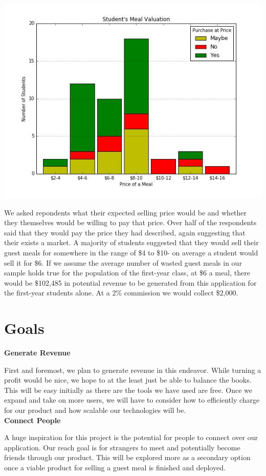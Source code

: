 \documentclass[column,12pt]{article}
\begin{document}
\centerline{\includegraphics[scale=0.5]{meal_valuation.png}}
We asked repondents what their expected selling price would be and whether they themselves would be willing to pay that price. Over half of the respondents said that they would pay the price they had described, again suggesting that their exists a market. A majority of students suggested that they would sell their guest meals for somewhere in the range of \$4 to \$10- on average a student would sell it for \$6.
If we assume the average number of wasted guest meals in our sample holds true for the population of the first-year class, at \$6 a meal, there would be \$102,485 in potential revenue to be generated from this application for the first-year students alone. At a 2\% commission we would collect \$2,000. 

\section{Goals}
\textbf{Generate Revenue}

First and foremost, we plan to generate revenue in this endeavor. While turning a profit would be nice, we hope to at the least just be able to balance the books. This will be easy initially as there are the tools we have used are free. Once we expand and take on more users, we will have to consider how to efficiently charge for our product and how scalable our technologies will be. \\

\textbf{Connect People}

A huge inspiration for this project is the potential for people to connect over our application. Our reach goal is for strangers to meet and potentially become friends through our product. This will be explored more as a secondary option once a viable product for selling a guest meal is finished and deployed. \\
\end{document}
